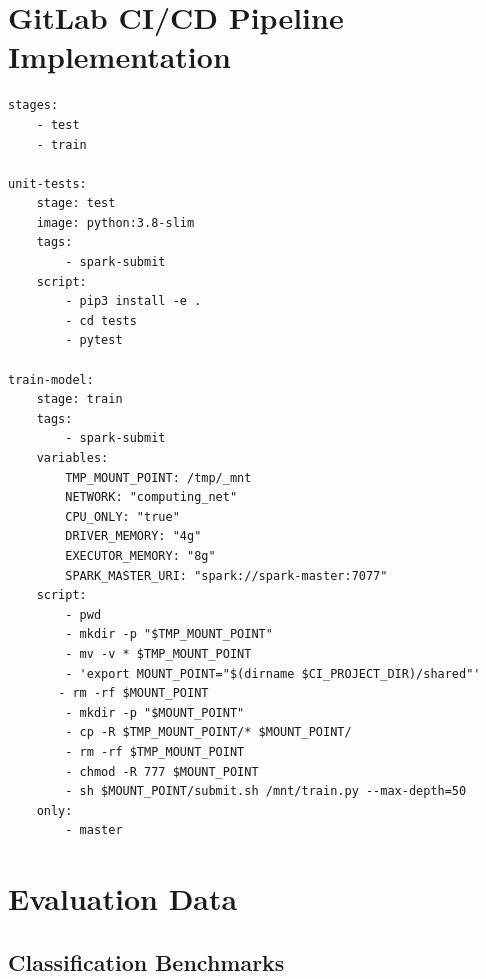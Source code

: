 \section{GitLab CI/CD Pipeline Implementation}

\begin{lstlisting}[label=lst:appendix_ci-pipeline_job, caption=texttt{.gitlab-ci.yml} configuration file]
stages:
    - test
    - train
 
unit-tests:
    stage: test
    image: python:3.8-slim
    tags:
        - spark-submit
    script:
        - pip3 install -e .
        - cd tests
        - pytest
 
train-model:
    stage: train
    tags:
        - spark-submit
    variables:
        TMP_MOUNT_POINT: /tmp/_mnt
        NETWORK: "computing_net"
        CPU_ONLY: "true"
        DRIVER_MEMORY: "4g"
        EXECUTOR_MEMORY: "8g"
        SPARK_MASTER_URI: "spark://spark-master:7077"
    script:
        - pwd
        - mkdir -p "$TMP_MOUNT_POINT"
        - mv -v * $TMP_MOUNT_POINT
        - 'export MOUNT_POINT="$(dirname $CI_PROJECT_DIR)/shared"'
       - rm -rf $MOUNT_POINT
        - mkdir -p "$MOUNT_POINT"
        - cp -R $TMP_MOUNT_POINT/* $MOUNT_POINT/
        - rm -rf $TMP_MOUNT_POINT
        - chmod -R 777 $MOUNT_POINT
        - sh $MOUNT_POINT/submit.sh /mnt/train.py --max-depth=50
    only:
        - master
\end{lstlisting}


\section{Evaluation Data}

\subsection{Classification Benchmarks}

